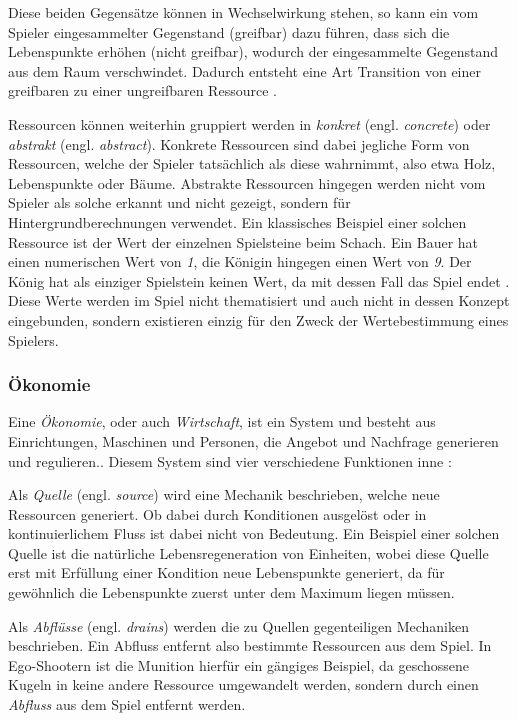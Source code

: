 Diese beiden Gegensätze können in Wechselwirkung stehen, so kann ein vom Spieler eingesammelter Gegenstand (greifbar) dazu führen, dass sich die Lebenspunkte erhöhen (nicht greifbar), wodurch der eingesammelte Gegenstand aus dem Raum verschwindet. Dadurch entsteht eine Art Transition von einer greifbaren zu einer ungreifbaren Ressource \cite*[]{book:gamedesign:resources}. 

Ressourcen können weiterhin gruppiert werden in \textit{konkret} (engl. \textit{concrete}) oder \textit{abstrakt} (engl. \textit{abstract}). Konkrete Ressourcen sind dabei jegliche Form von Ressourcen, welche der Spieler tatsächlich als diese wahrnimmt, also etwa Holz, Lebenspunkte oder Bäume. Abstrakte Ressourcen hingegen werden nicht vom Spieler als solche erkannt und nicht gezeigt, sondern für Hintergrundberechnungen verwendet. Ein klassisches Beispiel einer solchen Ressource ist der Wert der einzelnen Spielsteine beim Schach. Ein Bauer hat einen numerischen Wert von \textit{1}, die Königin hingegen einen Wert von \textit{9}. Der König hat als einziger Spielstein keinen Wert, da mit dessen Fall das Spiel endet \cite*[]{chesspieces}. Diese Werte werden im Spiel nicht thematisiert und auch nicht in dessen Konzept eingebunden, sondern existieren einzig für den Zweck der Wertebestimmung eines Spielers.

\subsubsection{Ökonomie}
Eine \textit{Ökonomie}, oder auch \textit{Wirtschaft}, ist ein System und \glqq [...] besteht aus Einrichtungen, Maschinen und Personen, die Angebot und Nachfrage generieren und regulieren.\grqq \cite*[]{definition:economy}. Diesem System sind vier verschiedene Funktionen inne \cite*[]{book:gamedesign:economy,article:medium:economy}:

Als \textit{Quelle} (engl. \textit{source}) wird eine Mechanik beschrieben, welche neue Ressourcen generiert. Ob dabei durch Konditionen ausgelöst oder in kontinuierlichem Fluss ist dabei nicht von Bedeutung. Ein Beispiel einer solchen Quelle ist die natürliche Lebensregeneration von Einheiten, wobei diese Quelle erst mit Erfüllung einer Kondition neue Lebenspunkte generiert, da für gewöhnlich die Lebenspunkte zuerst unter dem Maximum liegen müssen.

Als \textit{Abflüsse} (engl. \textit{drains}) werden die zu Quellen gegenteiligen Mechaniken beschrieben. Ein Abfluss entfernt also bestimmte Ressourcen aus dem Spiel. In Ego-Shootern ist die Munition hierfür ein gängiges Beispiel, da geschossene Kugeln in keine andere Ressource umgewandelt werden, sondern durch einen \textit{Abfluss} aus dem Spiel entfernt werden.

